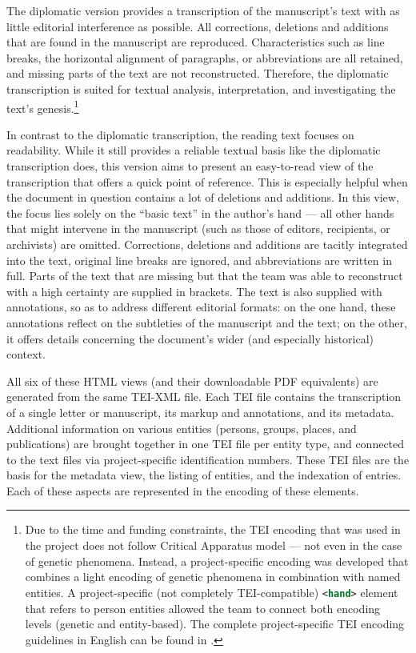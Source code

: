 \begin{paper}
The diplomatic version provides a transcription of the manuscript's text with as little editorial interference as possible. All
corrections, deletions and additions that are found in the manuscript are
reproduced. Characteristics such as line breaks, the horizontal alignment of
paragraphs, or abbreviations are all retained, and missing parts of the
text are not reconstructed. Therefore, the diplomatic transcription is
suited for textual analysis, interpretation, and investigating the text's genesis.\footnote{Due to the time and funding
  constraints, the TEI encoding that was used in the project does not follow Critical Apparatus model \citep{consortium_critical_2020} --- not even in the case of genetic phenomena. Instead, a project-specific encoding
  was developed that combines a light encoding of genetic phenomena in
  combination with named entities. A project-specific (not completely
  TEI-compatible) \lstinline[language=XML]!<hand>! element  that refers to person
  entities allowed the team to connect both encoding levels (genetic and
  entity-based). The complete project-specific TEI encoding guidelines in English
  can be found in \citealt{baillot_edition-specific_2016}.}

In contrast to the diplomatic transcription, the reading text focuses on readability. While it still provides a reliable textual basis like the diplomatic transcription does, this version aims
to present an easy-to-read view of the transcription that offers a quick
point of reference. This is especially helpful when the document in question contains a lot of
deletions and additions. In this view, the focus lies solely on the ``basic
text'' in the author's hand --- all other hands that might intervene in the
manuscript (such as those of editors, recipients, or archivists) are omitted.
Corrections, deletions and additions are tacitly integrated into the text,
original line breaks are ignored, and abbreviations are written in full.
Parts of the text that are missing but that the team was able to reconstruct with a high
certainty are supplied in brackets. The text is also supplied with annotations,
so as to address different editorial formats: on the one hand, these annotations
reflect on the subtleties of the manuscript and the text; on the other, it offers details concerning the document's wider (and especially
historical) context.

All six of these HTML views (and their downloadable PDF equivalents) are generated from the same TEI-XML file.
Each TEI file contains the transcription of a single letter or
manuscript, its markup and annotations, and its metadata. Additional
information on various entities (persons, groups, places, and publications)
are brought together in one TEI file per entity type, and connected to
the text files via project-specific identification numbers. These TEI
files are the basis for the metadata view, the listing of
entities, and the indexation of entries. Each of these aspects are represented in the encoding
of these elements.


\end{paper}
